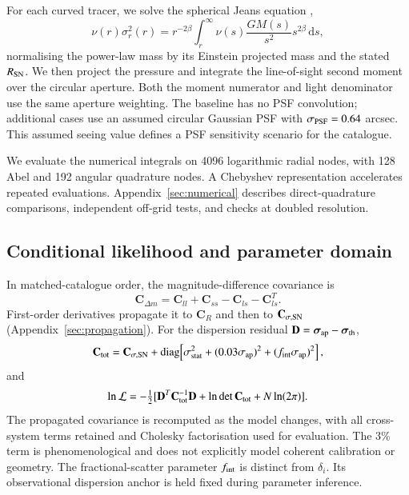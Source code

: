 \documentclass{aa}
\begin{document}
For each curved tracer, we solve the spherical Jeans equation \citep{Binney1980,MamonLokas2005},
\begin{equation}
\nu(r)\sigma_r^2(r)=r^{-2\beta}\int_r^\infty\nu(s)\frac{GM(s)}{s^2}s^{2\beta}\,\mathrm ds,
\end{equation}
normalising the power-law mass by its Einstein projected mass and the stated $R_{\rm SN}$. We then project the pressure and integrate the line-of-sight second moment over the circular aperture. Both the moment numerator and light denominator use the same aperture weighting. The baseline has no PSF convolution; additional cases use an assumed circular Gaussian PSF with $\sigma_{\rm PSF}=0.64$ arcsec. This assumed seeing value defines a PSF sensitivity scenario for the catalogue.

We evaluate the numerical integrals on 4096 logarithmic radial nodes, with 128 Abel and 192 angular quadrature nodes. A Chebyshev representation accelerates repeated evaluations. Appendix~\ref{sec:numerical} describes direct-quadrature comparisons, independent off-grid tests, and checks at doubled resolution.

\subsection{Conditional likelihood and parameter domain}\label{sec:stats}
In matched-catalogue order, the magnitude-difference covariance is
\begin{equation}\label{eq:Cdifference}
\mathbf C_{\Delta m}=\mathbf C_{ll}+\mathbf C_{ss}-\mathbf C_{ls}-\mathbf C_{ls}^{T}.
\end{equation}
First-order derivatives propagate it to $\mathbf C_R$ and then to $\mathbf C_{\sigma,{\rm SN}}$ (Appendix~\ref{sec:propagation}). For the dispersion residual $\mathbf D=\boldsymbol\sigma_{\rm ap}-\boldsymbol\sigma_{\rm th}$,
\begin{equation}\label{eq:Ctotal}
\mathbf C_{\rm tot}=\mathbf C_{\sigma,{\rm SN}}+
\operatorname{diag}\!\left[\sigma_{\rm stat}^2+(0.03\sigma_{\rm ap})^2+(f_{\rm int}\sigma_{\rm ap})^2\right],
\end{equation}
and
\begin{equation}\label{eq:likelihood}
\ln\mathcal L=-\tfrac12[\mathbf D^T\mathbf C_{\rm tot}^{-1}\mathbf D+
\ln\det\mathbf C_{\rm tot}+N\ln(2\pi)].
\end{equation}
The propagated covariance is recomputed as the model changes, with all cross-system terms retained and Cholesky factorisation used for evaluation. The 3\% term is phenomenological and does not explicitly model coherent calibration or geometry. The fractional-scatter parameter $f_{\rm int}$ is distinct from $\delta_i$. Its observational dispersion anchor is held fixed during parameter inference.
\end{document}
